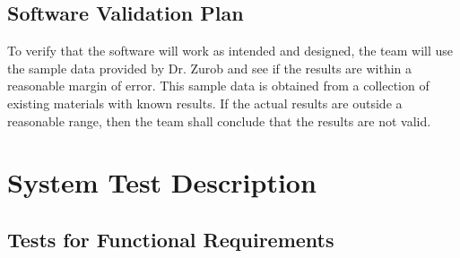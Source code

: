 \documentclass[12pt, titlepage]{article}
\begin{document}

\subsection{Software Validation Plan}

To verify that the software will work as intended and designed, the team will use the sample 
data provided by Dr. Zurob and see if the results are within a reasonable margin of error. This
sample data is obtained from a collection of existing materials with known results. If the actual 
results are outside a reasonable range, then the team shall conclude that the results are not valid. 




\section{System Test Description}
	
\subsection{Tests for Functional Requirements}
\end{document}
